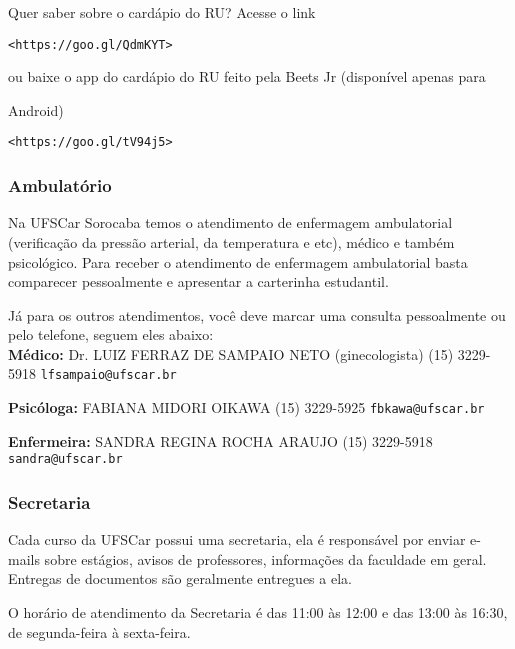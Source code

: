 Quer saber sobre o cardápio do RU? Acesse o link

\texttt{<https://goo.gl/QdmKYT>}

ou baixe o app do cardápio do RU feito pela Beets Jr (disponível apenas para

Android)

\texttt{<https://goo.gl/tV94j5>}

\subsubsection{Ambulatório}
Na UFSCar Sorocaba temos o atendimento de enfermagem ambulatorial (verificação da pressão arterial, da temperatura e etc), médico e também psicológico. Para receber o atendimento de enfermagem ambulatorial basta comparecer pessoalmente e apresentar a carterinha estudantil.

Já para os outros atendimentos, você deve marcar uma consulta pessoalmente ou pelo telefone, seguem eles abaixo: \\

\bigbreak
\noindent \textbf{Médico:}
\newline Dr. LUIZ FERRAZ DE SAMPAIO NETO (ginecologista)
\newline (15) 3229-5918
\newline \texttt{lfsampaio@ufscar.br}

\begin{multicols}{2}
\noindent \textbf{Psicóloga:}
  \newline FABIANA MIDORI OIKAWA
  \newline (15) 3229-5925
  \newline \texttt{fbkawa@ufscar.br}

\noindent \textbf{Enfermeira:}
  \newline SANDRA REGINA ROCHA ARAUJO
  \newline (15) 3229-5918
  \newline \texttt{sandra@ufscar.br}

\end{multicols}

\subsubsection{Secretaria}
Cada curso da UFSCar possui uma secretaria, ela é responsável por enviar e-mails sobre estágios, avisos de professores, informações da faculdade em geral. Entregas de documentos são geralmente entregues a ela.

O horário de atendimento da Secretaria é das 11:00 às 12:00 e das 13:00 às 16:30, de segunda-feira à sexta-feira.

